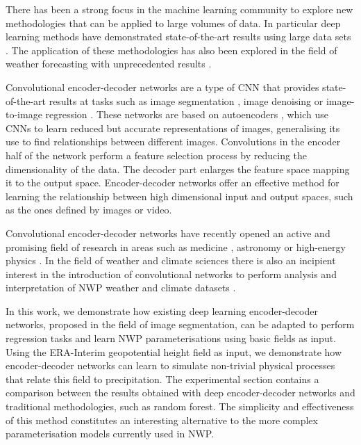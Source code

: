 \documentclass[twocol]{ametsoc}
\begin{document}
There has been a strong focus in the machine learning community to explore new methodologies that can be applied to large volumes of data. In particular deep learning \citep{lecun2015deep} methods have demonstrated state-of-the-art results using large data sets \citep{deng2009imagenet,openimages}. The application of these methodologies has also been explored in the field of weather forecasting with unprecedented results \citep{xingjian2015convolutional,liu2016application,rasp2018deep}.

Convolutional encoder-decoder networks are a type of CNN that provides state-of-the-art results at tasks such as image segmentation \citep{badrinarayanan2017segnet}, image denoising \citep{mao2016image} or image-to-image regression \citep{isola2017image}. These networks are based on autoencoders \citep{hinton2006reducing}, which use CNNs to learn reduced but accurate representations of images, generalising its use to find relationships between different images. Convolutions in the encoder half of the network perform a feature selection process by reducing the dimensionality of the data. The decoder part enlarges the feature space mapping it to the output space. Encoder-decoder networks offer an effective method for learning the relationship between high dimensional input and output spaces, such as the ones defined by images or video.

Convolutional encoder-decoder networks have recently opened an active and promising field of research in areas such as medicine \citep{greenspan2016guest}, astronomy \citep{shallue2018identifying} or high-energy physics \citep{baldi2014searching}. In the field of weather and climate sciences there is also an incipient interest in the introduction of convolutional networks to perform analysis and interpretation of NWP weather and climate datasets \citep{liu2016application,xingjian2015convolutional,larraondo2017automating}.

In this work, we demonstrate how existing deep learning encoder-decoder networks, proposed in the field of image segmentation, can be adapted to perform regression tasks and learn NWP parameterisations using basic fields as input. Using the ERA-Interim geopotential height field as input, we demonstrate how encoder-decoder networks can learn to simulate non-trivial physical processes that relate this field to precipitation. The experimental section contains a comparison between the results obtained with deep encoder-decoder networks and traditional methodologies, such as random forest. The simplicity and effectiveness of this method constitutes an interesting alternative to the more complex parameterisation models currently used in NWP.
\end{document}
